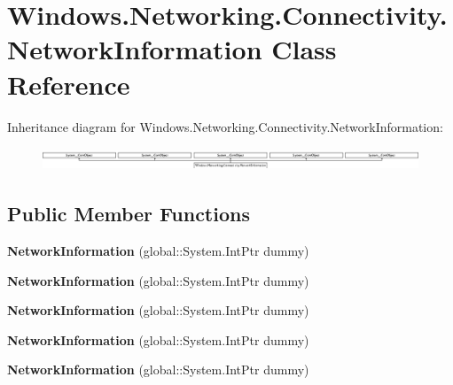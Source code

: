 \hypertarget{class_windows_1_1_networking_1_1_connectivity_1_1_network_information}{}\section{Windows.\+Networking.\+Connectivity.\+Network\+Information Class Reference}
\label{class_windows_1_1_networking_1_1_connectivity_1_1_network_information}
Inheritance diagram for Windows.\+Networking.\+Connectivity.\+Network\+Information\+:\begin{figure}[H]
\begin{center}
\leavevmode
\includegraphics[height=0.693498cm]{class_windows_1_1_networking_1_1_connectivity_1_1_network_information}
\end{center}
\end{figure}
\subsection*{Public Member Functions}
\begin{DoxyCompactItemize}
\item 
\mbox{\label{class_windows_1_1_networking_1_1_connectivity_1_1_network_information_a5000bd22ba8b3c40455d72f515863f03}} 
{\bfseries Network\+Information} (global\+::\+System.\+Int\+Ptr dummy)
\item 
\mbox{\label{class_windows_1_1_networking_1_1_connectivity_1_1_network_information_a5000bd22ba8b3c40455d72f515863f03}} 
{\bfseries Network\+Information} (global\+::\+System.\+Int\+Ptr dummy)
\item 
\mbox{\label{class_windows_1_1_networking_1_1_connectivity_1_1_network_information_a5000bd22ba8b3c40455d72f515863f03}} 
{\bfseries Network\+Information} (global\+::\+System.\+Int\+Ptr dummy)
\item 
\mbox{\label{class_windows_1_1_networking_1_1_connectivity_1_1_network_information_a5000bd22ba8b3c40455d72f515863f03}} 
{\bfseries Network\+Information} (global\+::\+System.\+Int\+Ptr dummy)
\item 
\mbox{\label{class_windows_1_1_networking_1_1_connectivity_1_1_network_information_a5000bd22ba8b3c40455d72f515863f03}} 
{\bfseries Network\+Information} (global\+::\+System.\+Int\+Ptr dummy)
\end{DoxyCompactItemize}
